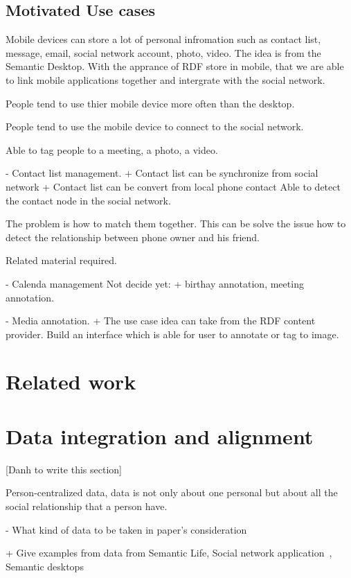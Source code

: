 \documentclass[runningheads,a4paper]{llncs}
\begin{document}
\subsection{Motivated Use cases}

 Mobile devices can store a lot of personal infromation such as contact list, message, email,   social network account, photo, video.
The idea is from the Semantic Desktop. With the apprance of RDF store in mobile, that we are able to link mobile applications together and intergrate with the social network.

People tend to use thier mobile device more often than the desktop. 

People tend to use the mobile device to connect to the social network. 
 
Able to tag people to a meeting, a photo, a video.

 - Contact list management. 
    + Contact list can be synchronize from social network
    + Contact list can be convert from local phone contact
Able to detect the contact node in the social network.



 The problem is how to match them together. This can be solve the issue how to detect the relationship between phone owner and his friend.

Related material required.
 
 - Calenda management
 Not decide yet:
  + birthay annotation, meeting annotation.

 - Media annotation. 
  + The use case idea can take from the RDF content provider. Build an interface which is able for user to annotate or tag to image.




\section{Related work}

\section{Data integration and alignment}

[Danh to write this section]

Person-centralized data, data is not only about one personal but about all the social relationship that a person have.

- What kind of data to be taken in paper's consideration

	+ Give examples from data from Semantic Life, Social network application~\cite{Tramp:2010}, Semantic desktops
\end{document}

